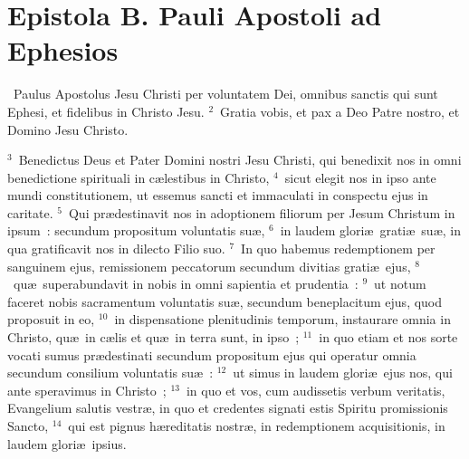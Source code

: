\clearpage
{\centering \section*{Epistola B. Pauli Apostoli ad Ephesios}}\thispagestyle{empty}

~Paulus Apostolus Jesu Christi per voluntatem Dei, omnibus sanctis qui sunt Ephesi, et fidelibus in Christo Jesu.
${}^{2}$~Gratia vobis, et pax a Deo Patre nostro, et Domino Jesu Christo.


${}^{3}$~Benedictus Deus et Pater Domini nostri Jesu Christi, qui benedixit nos in omni benedictione spirituali in c\ae lestibus in Christo,
${}^{4}$~sicut elegit nos in ipso ante mundi constitutionem, ut essemus sancti et immaculati in conspectu ejus in caritate.
${}^{5}$~Qui pr\ae destinavit nos in adoptionem filiorum per Jesum Christum in ipsum~: secundum propositum voluntatis su\ae ,
${}^{6}$~in laudem glori\ae\ grati\ae\ su\ae , in qua gratificavit nos in dilecto Filio suo.
${}^{7}$~In quo habemus redemptionem per sanguinem ejus, remissionem peccatorum secundum divitias grati\ae\ ejus,
${}^{8}$~qu\ae\ superabundavit in nobis in omni sapientia et prudentia~:
${}^{9}$~ut notum faceret nobis sacramentum voluntatis su\ae , secundum beneplacitum ejus, quod proposuit in eo,
${}^{10}$~in dispensatione plenitudinis temporum, instaurare omnia in Christo, qu\ae\ in c\ae lis et qu\ae\ in terra sunt, in ipso~;
${}^{11}$~in quo etiam et nos sorte vocati sumus pr\ae destinati secundum propositum ejus qui operatur omnia secundum consilium voluntatis su\ae~:
${}^{12}$~ut simus in laudem glori\ae\ ejus nos, qui ante speravimus in Christo~;
${}^{13}$~in quo et vos, cum audissetis verbum veritatis, Evangelium salutis vestr\ae , in quo et credentes signati estis Spiritu promissionis Sancto,
${}^{14}$~qui est pignus h\ae reditatis nostr\ae , in redemptionem acquisitionis, in laudem glori\ae\ ipsius.


